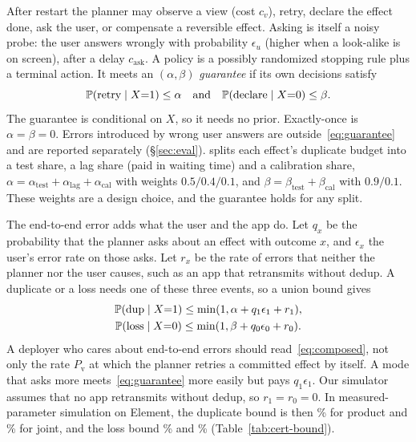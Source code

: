 After restart the planner may observe a view (cost $c_v$), retry, declare the effect done, ask the user, or compensate a
reversible effect. Asking is itself a noisy probe: the user answers wrongly with probability $\epsilon_u$ (higher when a look-alike is on screen), after a delay
$c_{\mathrm{ask}}$. A policy is a possibly randomized stopping rule plus a terminal action. It meets an $(\alpha,\beta)$ \emph{guarantee} if its own
decisions satisfy
\begin{equation}
\mathbb{P}(\text{retry}\mid X{=}1)\le\alpha \quad\text{and}\quad \mathbb{P}(\text{declare}\mid X{=}0)\le\beta .
\label{eq:guarantee}
\end{equation}
The guarantee is conditional on $X$, so it needs no prior. Exactly-once is $\alpha{=}\beta{=}0$. Errors introduced by wrong user answers are outside~\eqref{eq:guarantee}
and are reported separately (\S\ref{sec:eval}). \sys splits each effect's duplicate budget into a test share, a lag share (paid in waiting time) and a calibration share,
$\alpha=\alpha_{\mathrm{test}}+\alpha_{\mathrm{lag}}+\alpha_{\mathrm{cal}}$ with weights $0.5/0.4/0.1$, and $\beta=\beta_{\mathrm{test}}+\beta_{\mathrm{cal}}$ with $0.9/0.1$. These weights are
a design choice, and the guarantee holds for any split.

The end-to-end error adds what the user and the app do. Let $q_x$ be the probability that the planner asks about an effect with outcome $x$, and $\epsilon_x$ the user's
error rate on those asks. Let $r_x$ be the rate of errors that neither the planner nor the user causes, such as an app that retransmits without dedup. A duplicate or a loss
needs one of these three events, so a union bound gives
\begin{equation}
\begin{gathered}
\mathbb{P}(\mathrm{dup}\mid X{=}1)\le\min(1,\alpha+q_1\epsilon_1+r_1),\\
\mathbb{P}(\mathrm{loss}\mid X{=}0)\le\min(1,\beta+q_0\epsilon_0+r_0).
\end{gathered}
\label{eq:composed}
\end{equation}
A deployer who cares about end-to-end errors should read~\eqref{eq:composed}, not only the rate $P_{\mathrm v}$ at which the planner retries a committed effect by itself.
A mode that asks more meets~\eqref{eq:guarantee} more easily but pays $q_1\epsilon_1$. Our simulator assumes that no app retransmits without dedup, so $r_1{=}r_0{=}0$.
In measured-parameter simulation on Element, the duplicate bound is then \CertBoundElemProdDup\% for product and \CertBoundElemJointDup\% for joint, and the loss bound
\CertBoundElemProdLoss\% and \CertBoundElemJointLoss\% (Table~\ref{tab:cert-bound}).
